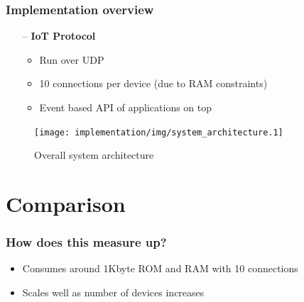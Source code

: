 \documentclass{beamer}
\begin{document}
\begin{frame}[t]\frametitle{Implementation overview}
\begin{itemize}
  \item [--] \textbf{IoT Protocol}
  \begin{itemize}
    \item Run over UDP
    \item 10 connections per device (due to RAM constraints)
    \item Event based API of applications on top
  \end{itemize}
  \end{itemize}

\begin{figure}[h!]
\centering
\texttt{[image: implementation/img/system\_architecture.1]}
\caption{Overall system architecture}
\label{fig:system_architecture}
\end{figure}
     
\end{frame}


\section{Comparison} %
\label{sec:comparison}
\begin{frame}[t]\frametitle{How does this measure up?}
\begin{itemize}
  \item Consumes around 1Kbyte ROM and RAM with 10 connections
  \item Scales well as number of devices increases
\end{itemize}
\end{frame}
\end{document}
